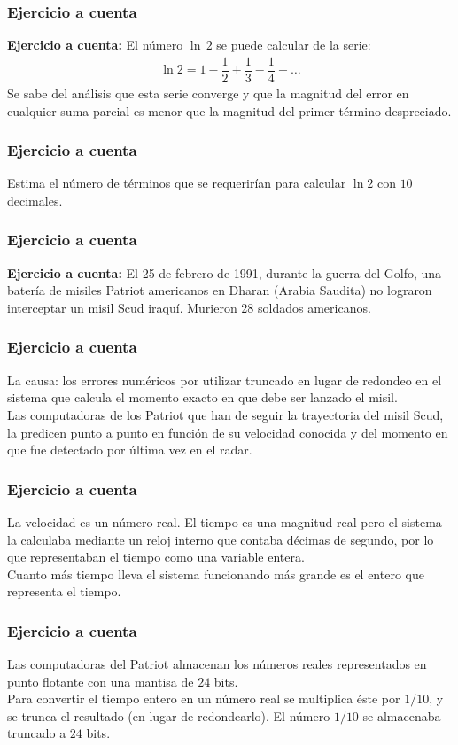 \documentclass[12pt]{beamer}
\begin{document}
\begin{frame}
\frametitle{Ejercicio a cuenta}
\textbf{Ejercicio a cuenta: } El número $\ln \, 2$ se puede calcular de la serie:
\begin{align*}
\ln 2 = 1 - \dfrac{1}{2} + \dfrac{1}{3} -\dfrac{1}{4} + \ldots
\end{align*}
Se sabe del análisis que esta serie converge y que la magnitud del error en cualquier suma parcial es menor que la magnitud del primer término despreciado.
\end{frame}
\begin{frame}
\frametitle{Ejercicio a cuenta}
Estima el número de términos que se requerirían para calcular $\ln 2$ con $10$ decimales.
\end{frame}
\begin{frame}
\frametitle{Ejercicio a cuenta}
\textbf{Ejercicio a cuenta: } El 25 de febrero de 1991, durante la guerra del Golfo, una batería de misiles Patriot americanos en Dharan (Arabia Saudita) no lograron interceptar un misil Scud iraquí. Murieron 28 soldados americanos.
\end{frame}
\begin{frame}
\frametitle{Ejercicio a cuenta}
La causa: los errores numéricos por utilizar truncado en lugar de redondeo en el sistema que calcula el momento exacto en que debe ser lanzado el misil.
\\
\bigskip
\pause
Las computadoras de los Patriot que han de seguir la trayectoria del misil Scud, la predicen punto a punto en función de su velocidad conocida y del momento en que fue detectado por última vez en el radar.
\end{frame}
\begin{frame}
\frametitle{Ejercicio a cuenta}
La velocidad es un número real. El tiempo es una magnitud real pero el sistema la calculaba mediante un reloj interno que contaba décimas de segundo, por lo que representaban el tiempo como una variable entera.
\\
\bigskip
\pause
Cuanto más tiempo lleva el sistema funcionando más grande es el entero que representa el tiempo.
\end{frame}
\begin{frame}
\frametitle{Ejercicio a cuenta}
Las computadoras del Patriot almacenan los números reales representados en punto flotante con una mantisa de $24$ bits.
\\
\bigskip
\pause
Para convertir el tiempo entero en un número real se multiplica éste por $1/10$, y se trunca el resultado (en lugar de redondearlo). El número $1/10$ se almacenaba truncado a $24$ bits.
\end{frame}
\end{document}
